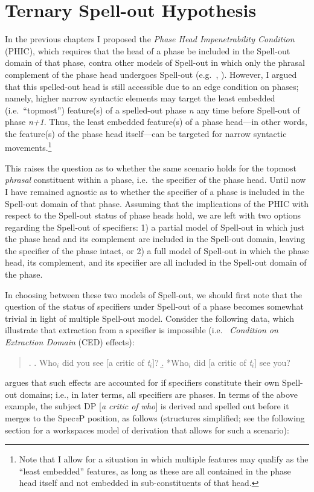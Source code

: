 \section{Ternary Spell-out Hypothesis}\label{tern_spellout_sec}
In the previous chapters I proposed the {\it Phase Head Impenetrability Condition} (PHIC), which requires that the head of a phase be included in the Spell-out domain of that phase, contra other models of Spell-out in which only the phrasal complement of the phase head undergoes Spell-out (e.g.\ , ). However, I argued that this spelled-out head is still accessible due to an edge condition on phases; namely, higher narrow syntactic elements may target the least embedded (i.e.\ ``topmost'') feature(s) of a spelled-out phase {\it n} any time before Spell-out of phase {\it n+1}. Thus, the least embedded feature(s) of a phase head---in other words, the feature(s) of the phase head itself---can be targeted for narrow syntactic movements.\footnote{Note that I allow for a situation in which multiple features may qualify as the ``least embedded'' features, as long as these are all contained in the phase head itself and not embedded in sub-constituents of that head.}

This raises the question as to whether the same scenario holds for the topmost {\it phrasal} constituent within a phase, i.e.\ the specifier of the phase head. Until now I have remained agnostic as to whether the specifier of a phase is included in the Spell-out domain of that phase. Assuming that the implications of the PHIC with respect to the Spell-out status of phase heads hold, we are left with two options regarding the Spell-out of specifiers: 1) a partial model of Spell-out in which just the phase head and its complement are included in the Spell-out domain, leaving the specifier of the phase intact, or 2) a full model of Spell-out in which the phase head, its complement, and its specifier are all included in the Spell-out domain of the phase.


In choosing between these two models of Spell-out, we should first note that the question of the status of specifiers under Spell-out of a phase becomes somewhat trivial in light of  multiple Spell-out model. Consider the following data, which illustrate that extraction from a specifier is impossible (i.e.\  {\it Condition on Extraction Domain} (CED) effects):

\singlespacing
\begin{quote}
\ex.
\a. Who$_{i}$ did you see [a critic of {\it t}$_{i}$]?
\b. *Who$_{i}$ did [a critic of {\it t}$_{i}$] see you?

\end{quote}
\onehalfspacing
\citet{uriagereka1999} argues that such effects are accounted for if specifiers constitute their own Spell-out domains; i.e., in later terms, all specifiers are phases. In terms of the above example, the subject DP [{\it a critic of who}] is derived and spelled out before it merges to the Spec{\it v}P position, as follows (structures simplified; see the following section for a workspaces model of derivation that allows for such a scenario):

